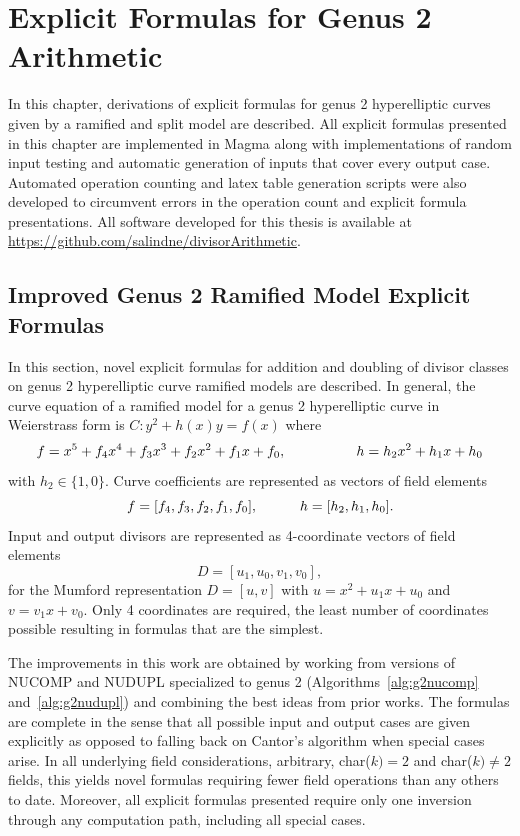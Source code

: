 
\chapter{Explicit Formulas for Genus 2 Arithmetic}\label{cha:g2} 
In this chapter, derivations of explicit formulas for genus 2 hyperelliptic
curves given by a ramified and split model are described. 
All explicit formulas presented in this chapter are
implemented in Magma along with implementations of random input testing and
automatic generation of inputs that cover every output case. Automated
operation counting and latex table generation scripts were also developed to
circumvent errors in the operation count and explicit formula presentations. All
software developed for this thesis is available at
\url{https://github.com/salindne/divisorArithmetic}.


\section{Improved Genus 2 Ramified Model Explicit Formulas}
\label{sec:g2ramExpl}
In this section, novel explicit formulas for addition and doubling of divisor
classes on genus 2 hyperelliptic curve ramified models are described. In
general, the curve equation of a ramified model for a genus 2 hyperelliptic
curve in Weierstrass form is $C: y^2 + h(x)y = f(x)$ where
$$f = x^5 + f_4x^4 + f_3x^3 + f_2 x^2 + f_1x + f_0, \quad\quad\quad\quad\quad h = h_2x^2 + h_1x
+ h_0$$ with $h_2 \in \{1,0\}$. Curve coefficients are represented as vectors of
field elements $$f = [f_4,f_3,f_2,f_1,f_0], \quad\quad\quad h = [h_2,h_1,h_0].$$ Input
and output divisors are represented as 4-coordinate vectors of field elements $$
D = [u_1,u_0,v_1,v_0],$$ for the Mumford representation $D = [u,v]$ with $u =
x^2 + u_1x + u_0$ and $v = v_1x + v_0$. Only 4 coordinates are required, the
least number of coordinates possible resulting in formulas that are the
simplest.

The improvements in this work are obtained by working from versions of NUCOMP
and NUDUPL specialized to genus 2 (Algorithms~\ref{alg:g2nucomp}
and~\ref{alg:g2nudupl}) and combining the best ideas from prior works. The
formulas are complete in the sense that all possible input and output cases are
given explicitly as opposed to falling back on Cantor's algorithm when special
cases arise. In all underlying field considerations, arbitrary, char($k) = 2$
and char($k) \not = 2$ fields, this yields novel formulas requiring fewer field
operations than any others to date. Moreover,  all explicit formulas presented
require only one inversion through any computation path, including all special
cases. 

